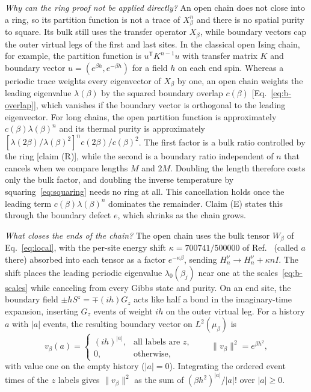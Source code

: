 \documentclass[aps,prl,reprint,amsmath,amssymb,nofootinbib,raggedbottom]{revtex4-2}
\begin{document}
\emph{Why can the ring proof not be applied directly?} An open chain
\tnchain[node=xvertex,caps]{,\cdots,} does not close into a ring, so its
partition function is not a trace of $X_\beta^n$ and there is no spatial purity
to square. Its bulk still uses the transfer operator $X_\beta$, while boundary
vectors cap the outer virtual legs of the first and last sites. In the
classical open Ising chain, for example, the partition function is
$u^{\mathsf T}K^{n-1}u$ with transfer matrix $K$ and boundary vector
$u=(e^{\beta h},e^{-\beta h})$ for a field $h$ on each end spin. Whereas a
periodic trace \tnchain[node=xvertex,ring]{,\cdots,} weights every eigenvector
of $X_\beta$ by one, an open chain weights the leading eigenvalue
$\lambda(\beta)$ by the squared boundary overlap $c(\beta)$
[Eq.~\eqref{eq:b-overlap}], which vanishes if the boundary vector is orthogonal
to the leading eigenvector. For long chains, the open partition function is
approximately $c(\beta)\lambda(\beta)^n$ and its thermal purity is
approximately $[\lambda(2\beta)/\lambda(\beta)^2]^n c(2\beta)/c(\beta)^2$. The
first factor is a bulk ratio controlled by the ring [claim (R)], while the
second is a boundary ratio independent of $n$ that cancels when we compare
lengths $M$ and $2M$. Doubling the length therefore costs only the bulk factor,
and doubling the inverse temperature by squaring~\eqref{eq:squaring} needs no
ring at all. This cancellation holds once the leading term
$c(\beta)\lambda(\beta)^n$ dominates the remainder. Claim (E) states this through the
boundary defect $e$, which shrinks as the chain grows.

\emph{What closes the ends of the chain?} The open chain uses the bulk tensor
$W_\beta$ of Eq.~\eqref{eq:local}, with the per-site energy shift
$\kappa=700741/500000$ of Ref.~\cite{boundary} (called $a$ there) absorbed into
each tensor as a factor $e^{-\kappa\beta}$, sending
$H_n^\nu\to H_n^\nu+\kappa nI$. The shift places the leading periodic
eigenvalue $\lambda_0(\beta_j)$ near one at the scales~\eqref{eq:b-scales}
while canceling from every Gibbs state and purity. On an end site, the boundary
field $\pm hS^z=\mp(ih)G_z$ acts like half a bond in the imaginary-time
expansion, inserting $G_z$ events of weight $ih$ on the outer virtual leg. For
a history $a$ with $|a|$ events, the resulting boundary vector on
$L^2(\mu_\beta)$ is
\begin{equation}
 v_\beta(a)=
 \begin{cases}(ih)^{|a|},&\text{all labels are }z,\\0,&\text{otherwise},
 \end{cases}
 \qquad \|v_\beta\|^2=e^{\beta h^2},
 \label{eq:b-vector}
\end{equation}
with value one on the empty history ($|a|=0$). Integrating the ordered event
times of the $z$ labels gives $\|v_\beta\|^2$ as the sum of
$(\beta h^2)^{|a|}/|a|!$ over $|a|\ge0$.
\end{document}
